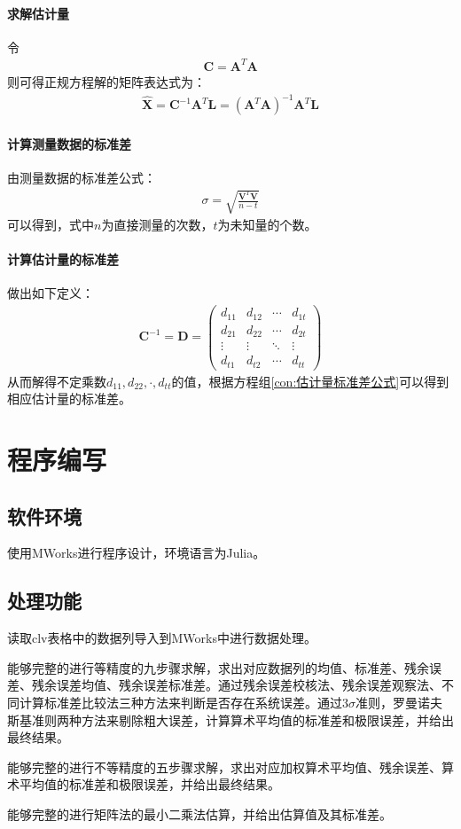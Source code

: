 \documentclass{ctexart}
\begin{document}
					\paragraph{求解估计量}令
					\begin{gather*}
						\bm{C}=\bm{A}^T\bm{A}
					\end{gather*}
					则可得正规方程解的矩阵表达式为：
					\begin{gather*}
						\bm{\hat{X}}=\bm{C}^{-1}\bm{A}^T\bm{L}=(\bm{A}^T\bm{A})^{-1}\bm{A}^T\bm{L}
					\end{gather*}
				\paragraph{计算测量数据的标准差}
					由测量数据的标准差公式：
					\begin{gather*}
						\sigma=\sqrt{\frac{\bm{V}^T \bm{V}}{n-t}}
					\end{gather*}
					可以得到，式中$n$为直接测量的次数，$t$为未知量的个数。
				\paragraph{计算估计量的标准差}
					做出如下定义：
					\begin{gather*}
						\bm{C}^{-1}=\bm{D}=
						\begin{pmatrix}
							d_{11} & d_{12} & \cdots& d_{1t} \\
							d_{21} & d_{22} & \cdots& d_{2t} \\
							\vdots & \vdots & \ddots& \vdots \\
							d_{t1} & d_{t2} & \cdots& d_{tt} 
						\end{pmatrix}
					\end{gather*}
					从而解得不定乘数$d_{11},d_{22},\cdot,d_{tt}$的值，根据方程组\ref{con:估计量标准差公式}可以得到相应估计量的标准差。
	\newpage
	\section{程序编写}
		\subsection{软件环境}
			使用MWorks进行程序设计，环境语言为Julia。
		\subsection{处理功能}
		读取clv表格中的数据列导入到MWorks中进行数据处理。\par
		能够完整的进行等精度的九步骤求解，求出对应数据列的均值、标准差、残余误差、残余误差均值、残余误差标准差。通过残余误差校核法、残余误差观察法、不同计算标准差比较法三种方法来判断是否存在系统误差。通过3$\sigma$准则，罗曼诺夫斯基准则两种方法来剔除粗大误差，计算算术平均值的标准差和极限误差，并给出最终结果。\par
		能够完整的进行不等精度的五步骤求解，求出对应加权算术平均值、残余误差、算术平均值的标准差和极限误差，并给出最终结果。\par
		能够完整的进行矩阵法的最小二乘法估算，并给出估算值及其标准差。
\end{document}
